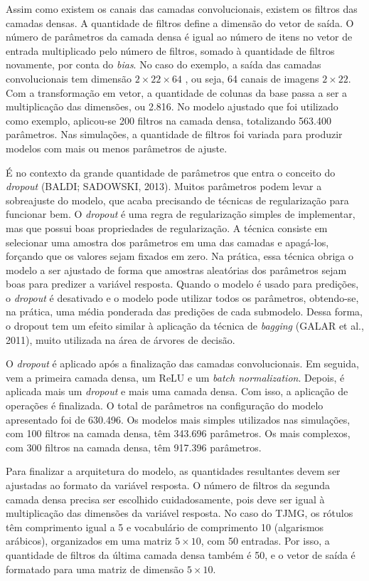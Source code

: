 \documentclass[12pt,twoside,brazilian]{book}
\begin{document}
Assim como existem os canais das camadas convolucionais, existem os
filtros das camadas densas. A quantidade de filtros define a dimensão do
vetor de saída. O número de parâmetros da camada densa é igual ao número
de itens no vetor de entrada multiplicado pelo número de filtros, somado
à quantidade de filtros novamente, por conta do \emph{bias}. No caso do
exemplo, a saída das camadas convolucionais tem dimensão
\(2\times22\times64\) , ou seja, 64 canais de imagens \(2\times 22\).
Com a transformação em vetor, a quantidade de colunas da base passa a
ser a multiplicação das dimensões, ou 2.816. No modelo ajustado que foi
utilizado como exemplo, aplicou-se 200 filtros na camada densa,
totalizando 563.400 parâmetros. Nas simulações, a quantidade de filtros
foi variada para produzir modelos com mais ou menos parâmetros de
ajuste.

É no contexto da grande quantidade de parâmetros que entra o conceito do
\emph{dropout} (BALDI; SADOWSKI, 2013). Muitos parâmetros podem levar a
sobreajuste do modelo, que acaba precisando de técnicas de regularização
para funcionar bem. O \emph{dropout} é uma regra de regularização
simples de implementar, mas que possui boas propriedades de
regularização. A técnica consiste em selecionar uma amostra dos
parâmetros em uma das camadas e apagá-los, forçando que os valores sejam
fixados em zero. Na prática, essa técnica obriga o modelo a ser ajustado
de forma que amostras aleatórias dos parâmetros sejam boas para predizer
a variável resposta. Quando o modelo é usado para predições, o
\emph{dropout} é desativado e o modelo pode utilizar todos os
parâmetros, obtendo-se, na prática, uma média ponderada das predições de
cada submodelo. Dessa forma, o dropout tem um efeito similar à aplicação
da técnica de \emph{bagging} (GALAR et al., 2011), muito utilizada na
área de árvores de decisão.

O \emph{dropout} é aplicado após a finalização das camadas
convolucionais. Em seguida, vem a primeira camada densa, um ReLU e um
\emph{batch normalization}. Depois, é aplicada mais um \emph{dropout} e
mais uma camada densa. Com isso, a aplicação de operações é finalizada.
O total de parâmetros na configuração do modelo apresentado foi de
630.496. Os modelos mais simples utilizados nas simulações, com 100
filtros na camada densa, têm 343.696 parâmetros. Os mais complexos, com
300 filtros na camada densa, têm 917.396 parâmetros.

Para finalizar a arquitetura do modelo, as quantidades resultantes devem
ser ajustadas ao formato da variável resposta. O número de filtros da
segunda camada densa precisa ser escolhido cuidadosamente, pois deve ser
igual à multiplicação das dimensões da variável resposta. No caso do
TJMG, os rótulos têm comprimento igual a 5 e vocabulário de comprimento
10 (algarismos arábicos), organizados em uma matriz \(5\times10\), com
50 entradas. Por isso, a quantidade de filtros da última camada densa
também é 50, e o vetor de saída é formatado para uma matriz de dimensão
\(5\times10\).
\end{document}
